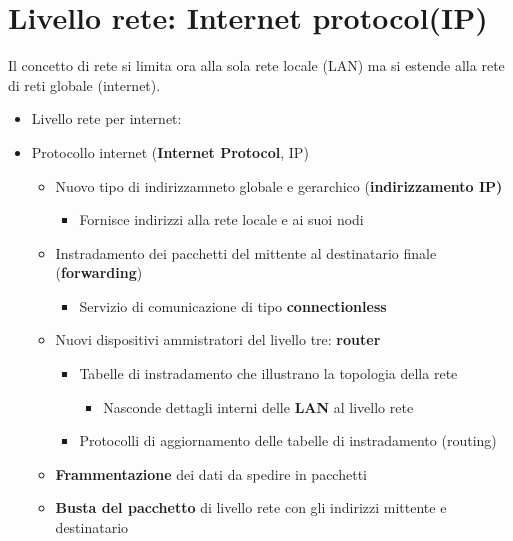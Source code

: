 \documentclass{article}
\begin{document}
\section{Livello rete: Internet protocol(IP)}
Il concetto di rete si limita ora alla sola rete locale (LAN) ma si estende alla rete di reti globale (internet).
\begin{itemize}
    \item Livello rete per internet:
    \item Protocollo internet (\textbf{Internet Protocol}, IP)
    \begin{itemize}
        \item Nuovo tipo di indirizzamneto globale e gerarchico (\textbf{indirizzamento IP)}
        \begin{itemize}
            \item Fornisce indirizzi alla rete locale e ai suoi nodi
        \end{itemize}
        \item Instradamento dei pacchetti del mittente al destinatario finale (\textbf{forwarding})
        \begin{itemize}
            \item Servizio di comunicazione di tipo \textbf{connectionless}
        \end{itemize}
        \item Nuovi dispositivi ammistratori del livello tre: \textbf{router}
        \begin{itemize}
            \item Tabelle di instradamento che illustrano la topologia della rete
            \begin{itemize}
                \item Nasconde dettagli interni delle \textbf{LAN} al livello rete
            \end{itemize}
            \item Protocolli di aggiornamento delle tabelle di instradamento (routing)
        \end{itemize}
        \item \textbf{Frammentazione} dei dati da spedire in pacchetti
        \item \textbf{Busta del pacchetto} di livello rete con gli indirizzi mittente e destinatario
    \end{itemize}
\end{itemize}
\end{document}
